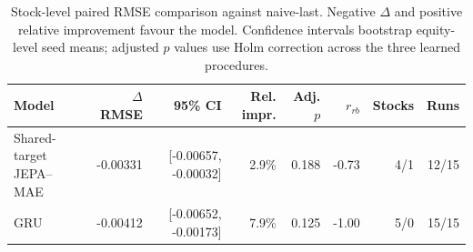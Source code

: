 \begin{table}[t]
\centering
\small
\caption{Stock-level paired RMSE comparison against naive-last. Negative $\Delta$ and positive relative improvement favour the model. Confidence intervals bootstrap equity-level seed means; adjusted $p$ values use Holm correction across the three learned procedures.}
\label{tab:paired_rmse_naive}
\begin{tabular}{lrrrrrrr}
\toprule
Model & $\Delta$RMSE & 95\% CI & Rel. impr. & Adj. $p$ & $r_{rb}$ & Stocks & Runs \\
\midrule
Shared-target JEPA--MAE & -0.00331 & [-0.00657, -0.00032] & 2.9\% & 0.188 & -0.73 & 4/1 & 12/15 \\
GRU & -0.00412 & [-0.00652, -0.00173] & 7.9\% & 0.125 & -1.00 & 5/0 & 15/15 \\
\bottomrule
\end{tabular}
\end{table}
